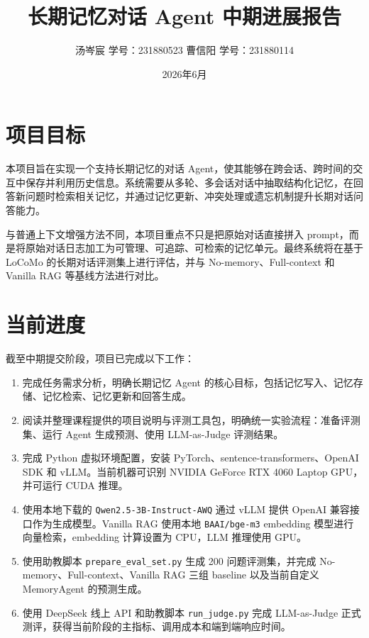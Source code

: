 \documentclass[UTF8,a4paper,11pt]{ctexart}
\title{\textbf{长期记忆对话 Agent 中期进展报告}}
\author{汤岑宸 \quad 学号：231880523 \quad 曹信阳 \quad 学号：231880114}
\date{2026年6月}
\begin{document}
\maketitle

\section{项目目标}

本项目旨在实现一个支持长期记忆的对话 Agent，使其能够在跨会话、跨时间的交互中保存并利用历史信息。系统需要从多轮、多会话对话中抽取结构化记忆，在回答新问题时检索相关记忆，并通过记忆更新、冲突处理或遗忘机制提升长期对话问答能力。

与普通上下文增强方法不同，本项目重点不只是把原始对话直接拼入 prompt，而是将原始对话日志加工为可管理、可追踪、可检索的记忆单元。最终系统将在基于 LoCoMo 的长期对话评测集上进行评估，并与 No-memory、Full-context 和 Vanilla RAG 等基线方法进行对比。

\section{当前进度}

截至中期提交阶段，项目已完成以下工作：

\begin{enumerate}
  \item 完成任务需求分析，明确长期记忆 Agent 的核心目标，包括记忆写入、记忆存储、记忆检索、记忆更新和回答生成。
  \item 阅读并整理课程提供的项目说明与评测工具包，明确统一实验流程：准备评测集、运行 Agent 生成预测、使用 LLM-as-Judge 评测结果。
  \item 完成 Python 虚拟环境配置，安装 PyTorch、sentence-transformers、OpenAI SDK 和 vLLM。当前机器可识别 NVIDIA GeForce RTX 4060 Laptop GPU，并可运行 CUDA 推理。
  \item 使用本地下载的 \texttt{Qwen2.5-3B-Instruct-AWQ} 通过 vLLM 提供 OpenAI 兼容接口作为生成模型。Vanilla RAG 使用本地 \texttt{BAAI/bge-m3} embedding 模型进行向量检索，embedding 计算设置为 CPU，LLM 推理使用 GPU。
  \item 使用助教脚本 \texttt{prepare\_eval\_set.py} 生成 200 问题评测集，并完成 No-memory、Full-context、Vanilla RAG 三组 baseline 以及当前自定义 MemoryAgent 的预测生成。
  \item 使用 DeepSeek 线上 API 和助教脚本 \texttt{run\_judge.py} 完成 LLM-as-Judge 正式测评，获得当前阶段的主指标、调用成本和端到端响应时间。
\end{enumerate}
\end{document}
